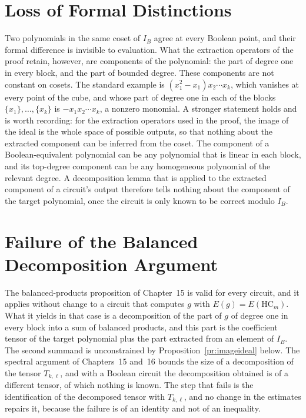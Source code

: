 \documentclass[11pt,letterpaper]{report}
\theoremstyle{plain}
\theoremstyle{definition}
\theoremstyle{remark}
\begin{document}
\section{Loss of Formal Distinctions}

Two polynomials in the same coset of $I_B$ agree at every Boolean point, and their formal difference is invisible to evaluation. What the extraction operators of the proof retain, however, are components of the polynomial: the part of degree one in every block, and the part of bounded degree. These components are not constant on cosets. The standard example is $(x_1^2-x_1)x_2\cdots x_k$, which vanishes at every point of the cube, and whose part of degree one in each of the blocks $\{x_1\},\dots,\{x_k\}$ is $-x_1x_2\cdots x_k$, a nonzero monomial. A stronger statement holds and is worth recording: for the extraction operators used in the proof, the image of the ideal is the whole space of possible outputs, so that nothing about the extracted component can be inferred from the coset. The component of a Boolean-equivalent polynomial can be any polynomial that is linear in each block, and its top-degree component can be any homogeneous polynomial of the relevant degree. A decomposition lemma that is applied to the extracted component of a circuit's output therefore tells nothing about the component of the target polynomial, once the circuit is only known to be correct modulo $I_B$.

\section{Failure of the Balanced Decomposition Argument}

The balanced-products proposition of Chapter~15 is valid for every circuit, and it applies without change to a circuit that computes $g$ with $E(g)=E(\mathrm{HC}_m)$. What it yields in that case is a decomposition of the part of $g$ of degree one in every block into a sum of balanced products, and this part is the coefficient tensor of the target polynomial plus the part extracted from an element of $I_B$. The second summand is unconstrained by Proposition~\ref{pr:imageideal} below. The spectral argument of Chapters~15 and~16 bounds the size of a decomposition of the tensor $T_{k,\ell}$, and with a Boolean circuit the decomposition obtained is of a different tensor, of which nothing is known. The step that fails is the identification of the decomposed tensor with $T_{k,\ell}$, and no change in the estimates repairs it, because the failure is of an identity and not of an inequality.
\end{document}
